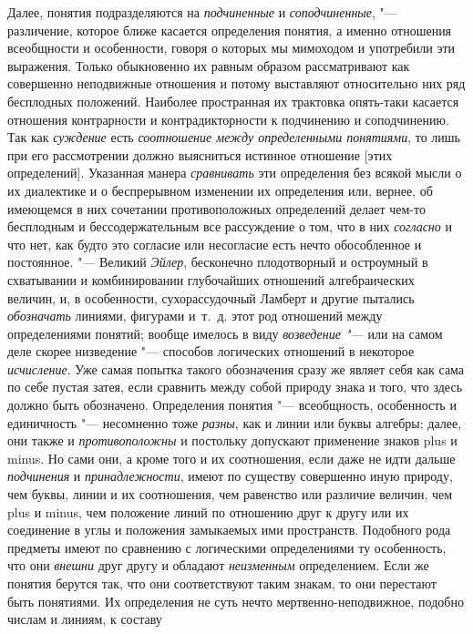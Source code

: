 Далее, понятия подразделяются на
{\em подчиненные} и
{\em соподчиненные}, "---
различение, которое ближе касается определения понятия, а
именно отношения всеобщности и особенности, говоря о которых мы мимоходом и
употребили эти
выражения.
Только обыкновенно их равным образом
рассматривают как совершенно неподвижные отношения и потому выставляют
относительно них ряд бесплодных положений. Наиболее пространная их
трактовка опять-таки касается отношения контрарности и контрадикторности к
подчинению и соподчинению. Так как
{\em суждение} есть
{\em соотношение между определенными
понятиями}, то лишь при его рассмотрении должно выясниться
истинное отношение [этих определений]. Указанная манера
{\em сравнивать} эти
определения без всякой мысли о их диалектике и о беспрерывном изменении их
определения или, вернее, об имеющемся в них сочетании противоположных
определений делает чем-то бесплодным и бессодержательным все рассуждение о
том, что в них {\em согласно}
и что нет, как будто это согласие или несогласие есть нечто
обособленное и постоянное. "--- Великий
{\em Эйлер}, бесконечно
плодотворный и остроумный в схватывании и комбинировании глубочайших
отношений алгебраических величин, и, в особенности, сухорассудочный Ламберт
и другие пытались {\em обозначать}
линиями, фигурами и~т.~д. этот род отношений между
определениями понятий; вообще имелось в виду
{\em возведение "--- }или на
самом деле скорее низведение "--- способов логических отношений
в некоторое {\em исчисление}.
Уже самая попытка такого обозначения сразу же являет себя как
сама по себе пустая затея, если сравнить между собой природу знака и того,
что здесь должно быть обозначено. Определения понятия
"--- всеобщность, особенность и единичность
"--- несомненно тоже
{\em разны}, как и линии
или буквы алгебры; далее, они также и
{\em противоположны} и
постольку допускают применение знаков plus и minus.
Но сами они, а кроме того и их соотношения, если даже не идти
дальше {\em подчинения} и
{\em принадлежности},
имеют по существу совершенно иную природу, чем буквы, линии и
их соотношения, чем равенство или различие величин, чем plus
и minus, чем положение линий по отношению друг
к другу или их соединение в углы и положения замыкаемых ими пространств.
Подобного рода предметы имеют по сравнению с логическими определениями ту
особенность, что они {\em внешни}
друг другу и обладают
{\em неизменным}
определением. Если же понятия берутся так, что они
соответствуют таким знакам, то они перестают быть понятиями. Их определения
не суть нечто мертвенно-неподвижное, подобно числам и линиям, к составу
